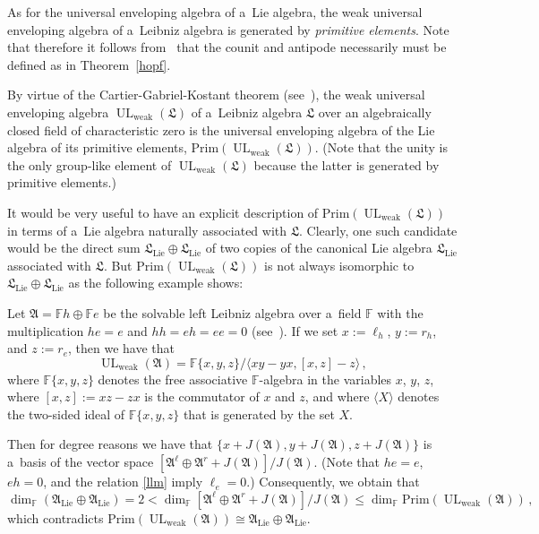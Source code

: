 \documentclass{jonasart}
\DeclareMathOperator{\lie}{Lie}
\DeclareMathOperator{\UL}{UL}
\DeclareMathOperator{\weak}{weak}
\newcommand{\af}{\mathfrak{A}}
\newcommand{\fbb}{\mathbb{F}}
\newcommand{\lf}{\mathfrak{L}}
\begin{document}
	\begin{remark}
		{As for the universal enveloping algebra of a~Lie algebra, the weak universal enveloping algebra of a~Leibniz algebra is generated by \emph{primitive elements\/}. Note that therefore it follows from~\cite[Proposition III.2.6 and (3.3)]{K} that the counit and antipode necessarily must be defined as in Theorem~\ref{hopf}.}

		{By virtue of the Cartier-Gabriel-Kostant theorem (see~\cite[Theorem 5.10.2]{EGNO}), the weak universal enveloping algebra $\UL_{\weak}(\lf)$ of a~Leibniz algebra $\lf$ over an algebraically closed field of characteristic zero is the universal enveloping algebra of the Lie algebra of its primitive elements, $\mathrm{Prim}
		(\UL_{\weak}(\lf))$. (Note that the unity is the only group-like element of $\UL_{\weak}(\lf)$
		because the latter is generated by primitive elements.)}
	\end{remark}
	It would be very useful to have an explicit description of
	$\mathrm{Prim}(\UL_{\weak}(\lf))$ in terms of a~Lie algebra naturally associated with $\lf$. Clearly, one such candidate would be the direct sum $\lf_{\lie}\oplus\lf_{\lie}$ of two copies of the canonical Lie algebra $\lf_{\lie}$ associated with $\lf$. But $\mathrm{Prim}(\UL_{\weak}(\lf))$ is not always isomorphic to $\lf_{\lie}\oplus\lf_{\lie}$ as the following example shows:
	\begin{example}
		{Let $\af=\fbb h\oplus\fbb e$ be the solvable left
		Leibniz algebra over a~field $\fbb$ with the multiplication
		$he=e$ and $hh=eh=ee=0$ (see~\cite[Example 2.3]{F1}). If we set $x:=\ell_h$, $y:=r_h$, and $z:=r_e$, then we have that}
		\[
			\UL_{\weak}(\af)=\fbb\{x,y,z\}/\langle xy-yx,[x,z]-z\rangle\,,
		\]
		{where $\fbb\{x,y,z\}$ denotes the free associative
		$\fbb$-algebra in the variables $x$, $y$, $z$, where $[x,z]:=xz-zx$
		is the commutator of $x$ and $z$, and where $\langle X\rangle$ denotes the two-sided ideal of $\fbb\{x,y,z\}$ that is generated by the set $X$.}

		{Then for degree reasons we have that $\{x+J(\af),y+J(\af), z+J(\af)\}$ is a~basis of the vector space $[\af^\ell\oplus\af^r
		+J(\af)]/J(\af)$. (Note that $he=e$, $eh=0$, and the relation
		\eqref{llm} imply $\ell_e =0$.) Consequently, we obtain that}
		\[
			\dim_\fbb(\af_{\lie}\oplus\af_{\lie})=2<\dim_\fbb[\af^\ell\oplus
			\af^r +J(\af)]/J(\af)\le\dim_\fbb\mathrm{Prim}(\UL_{\weak}(\af))\,,
		\]
		{which contradicts $\mathrm{Prim}(\UL_{\weak}(\af))\cong
		\af_{\lie}\oplus\af_{\lie}$.}
	\end{example}
\end{document}
